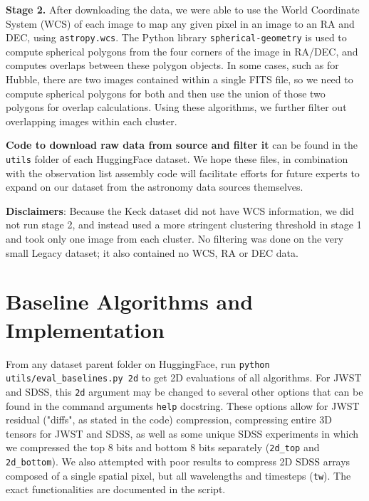 \textbf{Stage 2.} After downloading the data, we were able to use the World Coordinate System (WCS) of each image to map any given pixel in an image to an RA and DEC, using \texttt{astropy.wcs}. The Python library \texttt{spherical-geometry} is used to compute spherical polygons from the four corners of the image in RA/DEC, and computes overlaps between these polygon objects. In some cases, such as for Hubble, there are two images contained within a single FITS file, so we need to compute spherical polygons for both and then use the union of those two polygons for overlap calculations. Using these algorithms, we further filter out overlapping images within each cluster.

\textbf{Code to download raw data from source and filter it} can be found in the \texttt{utils} folder of each HuggingFace dataset. We hope these files, in combination with the observation list assembly code will facilitate efforts for future experts to expand on our dataset from the astronomy data sources themselves.


\textbf{Disclaimers}: Because the Keck dataset did not have WCS information, we did not run stage 2, and instead used a more stringent clustering threshold in stage 1 and took only one image from each cluster. No filtering was done on the very small Legacy dataset; it also contained no WCS, RA or DEC data.


\section{Baseline Algorithms and Implementation}\label{sec:protocol}

From any dataset parent folder on HuggingFace, run \texttt{python utils/eval\_baselines.py 2d} to get 2D evaluations of all algorithms. For JWST and SDSS, this \texttt{2d} argument may be changed to several other options that can be found in the command arguments \texttt{help} docstring. These options allow for JWST residual ("diffs", as stated in the code) compression, compressing entire 3D tensors for JWST and SDSS, as well as some unique SDSS experiments in which we compressed the top 8 bits and bottom 8 bits separately (\texttt{2d\_top} and \texttt{2d\_bottom}). We also attempted with poor results to compress 2D SDSS arrays composed of a single spatial pixel, but all wavelengths and timesteps (\texttt{tw}). The exact functionalities are documented in the script.

